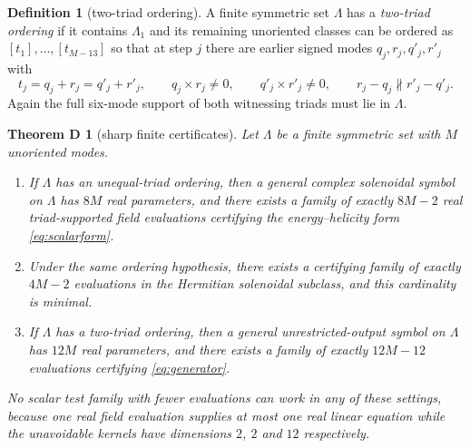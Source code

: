 \documentclass[11pt]{article}
\theoremstyle{definition}
\newtheorem{definition}[theorem]{Definition}
\theoremstyle{remark}
\theoremstyle{plain}
\newtheorem*{thmD}{Theorem D}
\begin{document}
\begin{definition}[two-triad ordering]
\label{def:twotriad}
A finite symmetric set $\Lambda$ has a \emph{two-triad ordering} if it contains
$\Lambda_{1}$ and its remaining unoriented classes can be ordered as
$[t_{1}],\dots,[t_{M-13}]$ so that at step $j$ there are earlier signed modes
$q_{j},r_{j},q'_{j},r'_{j}$ with
\[
t_{j}=q_{j}+r_{j}=q'_{j}+r'_{j},
\qquad
q_{j}\times r_{j}\ne0,
\qquad
q'_{j}\times r'_{j}\ne0,
\qquad
r_{j}-q_{j}\not\parallel r'_{j}-q'_{j} .
\]
Again the full six-mode support of both witnessing triads must lie in
$\Lambda$.
\end{definition}

\begin{thmD}[sharp finite certificates]
\label{thm:D}
Let $\Lambda$ be a finite symmetric set with $M$ unoriented modes.
\begin{enumerate}
\item If $\Lambda$ has an unequal-triad ordering, then a general complex
solenoidal symbol on $\Lambda$ has $8M$ real parameters, and there exists a
family of exactly $8M-2$ real triad-supported field evaluations certifying the
energy--helicity form \eqref{eq:scalarform}.
\item Under the same ordering hypothesis, there exists a certifying family of
exactly $4M-2$ evaluations in the Hermitian solenoidal subclass, and this
cardinality is minimal.
\item If $\Lambda$ has a two-triad ordering, then a general
unrestricted-output symbol on $\Lambda$ has $12M$ real parameters, and there
exists a family of exactly $12M-12$ evaluations certifying
\eqref{eq:generator}.
\end{enumerate}
No scalar test family with fewer evaluations can work in any of these
settings, because one
real field evaluation supplies at most one real linear equation while the
unavoidable kernels have dimensions $2$, $2$ and $12$ respectively.
\end{thmD}
\end{document}
